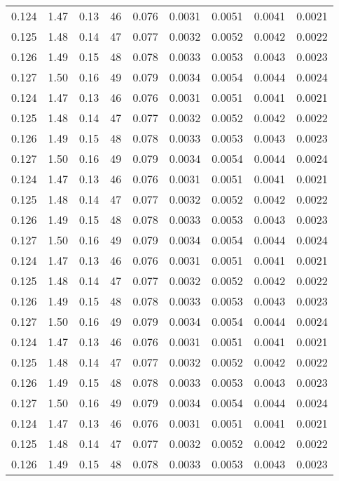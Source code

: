 \begin{longtable}{|c|c|c|c|c|c|c|c|c|}
        0.124 & 1.47 & 0.13 & 46 & 0.076 & 0.0031 & 0.0051 & 0.0041 & 0.0021 \\
    0.125 & 1.48 & 0.14 & 47 & 0.077 & 0.0032 & 0.0052 & 0.0042 & 0.0022 \\
    0.126 & 1.49 & 0.15 & 48 & 0.078 & 0.0033 & 0.0053 & 0.0043 & 0.0023 \\
    0.127 & 1.50 & 0.16 & 49 & 0.079 & 0.0034 & 0.0054 & 0.0044 & 0.0024 \\
        0.124 & 1.47 & 0.13 & 46 & 0.076 & 0.0031 & 0.0051 & 0.0041 & 0.0021 \\
    0.125 & 1.48 & 0.14 & 47 & 0.077 & 0.0032 & 0.0052 & 0.0042 & 0.0022 \\
    0.126 & 1.49 & 0.15 & 48 & 0.078 & 0.0033 & 0.0053 & 0.0043 & 0.0023 \\
    0.127 & 1.50 & 0.16 & 49 & 0.079 & 0.0034 & 0.0054 & 0.0044 & 0.0024 \\
        0.124 & 1.47 & 0.13 & 46 & 0.076 & 0.0031 & 0.0051 & 0.0041 & 0.0021 \\
    0.125 & 1.48 & 0.14 & 47 & 0.077 & 0.0032 & 0.0052 & 0.0042 & 0.0022 \\
    0.126 & 1.49 & 0.15 & 48 & 0.078 & 0.0033 & 0.0053 & 0.0043 & 0.0023 \\
    0.127 & 1.50 & 0.16 & 49 & 0.079 & 0.0034 & 0.0054 & 0.0044 & 0.0024 \\
        0.124 & 1.47 & 0.13 & 46 & 0.076 & 0.0031 & 0.0051 & 0.0041 & 0.0021 \\
    0.125 & 1.48 & 0.14 & 47 & 0.077 & 0.0032 & 0.0052 & 0.0042 & 0.0022 \\
    0.126 & 1.49 & 0.15 & 48 & 0.078 & 0.0033 & 0.0053 & 0.0043 & 0.0023 \\
    0.127 & 1.50 & 0.16 & 49 & 0.079 & 0.0034 & 0.0054 & 0.0044 & 0.0024 \\
        0.124 & 1.47 & 0.13 & 46 & 0.076 & 0.0031 & 0.0051 & 0.0041 & 0.0021 \\
    0.125 & 1.48 & 0.14 & 47 & 0.077 & 0.0032 & 0.0052 & 0.0042 & 0.0022 \\
    0.126 & 1.49 & 0.15 & 48 & 0.078 & 0.0033 & 0.0053 & 0.0043 & 0.0023 \\
    0.127 & 1.50 & 0.16 & 49 & 0.079 & 0.0034 & 0.0054 & 0.0044 & 0.0024 \\
        0.124 & 1.47 & 0.13 & 46 & 0.076 & 0.0031 & 0.0051 & 0.0041 & 0.0021 \\
    0.125 & 1.48 & 0.14 & 47 & 0.077 & 0.0032 & 0.0052 & 0.0042 & 0.0022 \\
    0.126 & 1.49 & 0.15 & 48 & 0.078 & 0.0033 & 0.0053 & 0.0043 & 0.0023 \\

\end{longtable}
